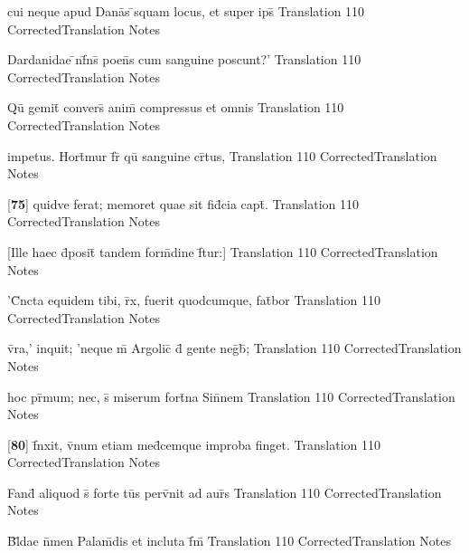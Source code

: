 \latline
  {cui neque apud Dana\={}s \={}squam locus, et super ips\={\macron {\i}}}
  { Translation }
  {110}
  { CorrectedTranslation }
  { Notes }


\latline
  {Dardanidae \={\macron {\i}}nf\={}ns\={\macron {\i}} poen\={}s cum sanguine poscunt?'}
  { Translation }
  {110}
  { CorrectedTranslation }
  { Notes }


\latline
  {Qu\={} gemit\={} convers\={\macron {\i}} anim\={\macron {\i}} compressus et omnis}
  { Translation }
  {110}
  { CorrectedTranslation }
  { Notes }


\latline
  {impetus.  Hort\={}mur f\={}r\={\macron {\i}} qu\={} sanguine cr\={}tus,}
  { Translation }
  {110}
  { CorrectedTranslation }
  { Notes }


\latline
  {[\textbf{75}] quidve ferat; memoret quae sit fid\={}cia capt\={}.}
  { Translation }
  {110}
  { CorrectedTranslation }
  { Notes }


\latline
  {[Ille haec d\={}posit\={} tandem form\={\macron {\i}}dine f\={}tur:] }
  { Translation }
  {110}
  { CorrectedTranslation }
  { Notes }


\latline
  {'C\={}ncta equidem tibi, r\={}x, fuerit quodcumque, fat\={}bor}
  { Translation }
  {110}
  { CorrectedTranslation }
  { Notes }


\latline
  {v\={}ra,' inquit; 'neque m\={} Argolic\={} d\={} gente neg\={}b\={};}
  { Translation }
  {110}
  { CorrectedTranslation }
  { Notes }


\latline
  {hoc pr\={\macron {\i}}mum; nec, s\={\macron {\i}} miserum fort\={}na Sin\={}nem}
  { Translation }
  {110}
  { CorrectedTranslation }
  { Notes }


\latline
  {[\textbf{80}] f\={\macron {\i}}nxit, v\={}num etiam med\={}cemque improba finget.}
  { Translation }
  {110}
  { CorrectedTranslation }
  { Notes }


\latline
  {Fand\={} aliquod s\={\macron {\i}} forte tu\={}s perv\={}nit ad aur\={\macron {\i}}s}
  { Translation }
  {110}
  { CorrectedTranslation }
  { Notes }


\latline
  {B\={}l\={\macron {\i}}dae n\={}men Palam\={}dis et incluta f\={}m\={}}
  { Translation }
  {110}
  { CorrectedTranslation }
  { Notes }


